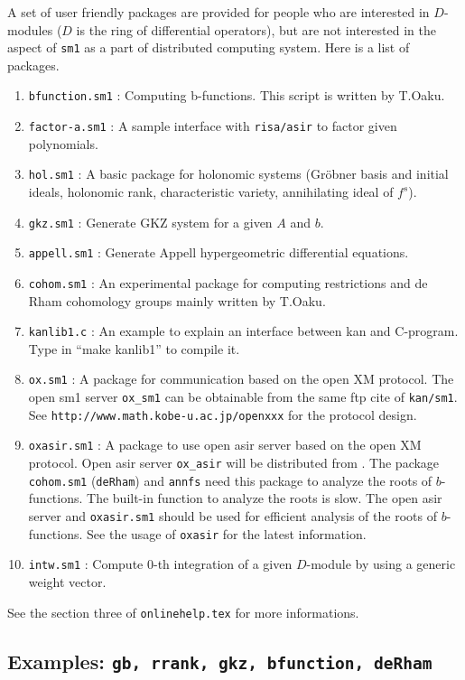 A set of user friendly packages are provided
for people who are interested in $D$-modules
($D$ is the ring of differential operators), but
are not interested in the aspect of {\tt sm1}
as a part of distributed computing system.
Here is a list of packages.
\begin{enumerate}
\item {\tt bfunction.sm1} : Computing b-functions.
                        This script is written by T.Oaku.
\item{\tt factor-a.sm1} : A sample interface with {\tt risa/asir} \cite{asir}
to factor given polynomials.
\item{\tt hol.sm1} : A basic package for holonomic systems (Gr\"obner basis and
initial ideals, holonomic rank, characteristic variety, annihilating ideal
of $f^s$).
\item{\tt gkz.sm1} : Generate GKZ system for a given $A$ and $b$.
\item{\tt appell.sm1} : Generate Appell hypergeometric differential equations.
\item{\tt cohom.sm1} : An experimental package for computing restrictions
and de Rham cohomology groups mainly written by T.Oaku.
\item {\tt kanlib1.c} : An example to explain an interface between kan and
 C-program. Type in ``make kanlib1'' to compile it.
\item{\tt ox.sm1} : A package for communication based on the open XM protocol.
The open sm1 server {\tt ox\_sm1} can be obtainable from the same ftp cite
of {\tt kan/sm1}.
See {\tt http://www.math.kobe-u.ac.jp/openxxx} for the protocol design.
\item{\tt oxasir.sm1} : A package to use open asir server based on the open
                        XM protocol.
Open asir server {\tt ox\_asir} will be distributed from \cite{asir}.
The package {\tt cohom.sm1} ({\tt deRham}) and {\tt annfs} need this package 
to analyze the roots of $b$-functions.
The built-in function to analyze the roots is slow. The open asir server
and {\tt oxasir.sm1} should be used for efficient analysis of the roots
of $b$-functions.
See the usage of {\tt oxasir} for the latest information.
\item{\tt intw.sm1} : Compute $0$-th integration of a given $D$-module
by using a generic weight vector.
\end{enumerate}

See the section three of {\tt onlinehelp.tex} for more informations.

\subsection{Examples: {\tt gb, rrank, gkz, bfunction, deRham}}

